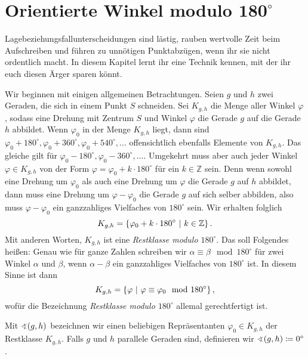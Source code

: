 \section{Orientierte Winkel modulo \texorpdfstring{$\boldsymbol{180^\circ}$}{180°}}\label{kapitel:OrientierteWinkel}
Lagebeziehungsfallunterscheidungen sind lästig, rauben wertvolle Zeit beim Aufschreiben und führen zu unnötigen Punktabzügen, wenn ihr sie nicht ordentlich macht. In diesem Kapitel lernt ihr eine Technik kennen, mit der ihr euch diesen Ärger sparen könnt.

Wir beginnen mit einigen allgemeinen Betrachtungen. Seien $g$ und $h$ zwei Geraden, die sich in einem Punkt $S$ schneiden. Sei $K_{g,h}$ die Menge aller Winkel $\varphi$, sodass eine Drehung mit Zentrum $S$ und Winkel $\varphi$ die Gerade $g$ auf die Gerade $h$ abbildet. Wenn $\varphi_0$ in der Menge $K_{g,h}$ liegt, dann sind $\varphi_0 + 180^\circ,\varphi_0 + 360^\circ,\varphi_0 + 540^\circ,\dotsc$ offensichtlich ebenfalls Elemente von $K_{g,h}$. Das gleiche gilt für $\varphi_0 - 180^\circ,\varphi_0 - 360^\circ,\dotsc$. Umgekehrt muss aber auch jeder Winkel $\varphi\in K_{g,h}$ von der Form $\varphi=\varphi_0 + k\cdot 180^\circ$ für ein $k\in \mathbb Z$ sein. Denn wenn sowohl eine Drehung um $\varphi_0$ als auch eine Drehung um $\varphi$ die Gerade $g$ auf $h$ abbildet, dann muss eine Drehung um $\varphi - \varphi_0$ die Gerade $g$ auf sich selber abbilden, also muss $\varphi - \varphi_0$ ein ganzzahliges Vielfaches von $180^\circ$ sein. Wir erhalten folglich
\begin{equation*}
	K_{g,h}=\braces*{\varphi_0 + k\cdot 180^\circ\ \middle|\  k\in \mathbb Z}\,.
\end{equation*}
Mit anderen Worten, $K_{g,h}$ ist eine \emph{Restklasse modulo $180^\circ$}. Das soll Folgendes heißen: Genau wie für ganze Zahlen schreiben wir $\alpha\equiv\beta \mod 180^\circ$ für zwei Winkel $\alpha$ und $\beta$, wenn $\alpha - \beta$ ein ganzzahliges Vielfaches von $180^\circ$ ist. In diesem Sinne ist dann
\begin{equation*}
	K_{g,h}=\braces*{\varphi\ \middle|\ \varphi\equiv\varphi_0 \mod 180^\circ}\,,
\end{equation*}
wofür die Bezeichnung \emph{Restklasse modulo $180^\circ$} allemal gerechtfertigt ist.
\begin{definition}
	Mit $\winkel(g,h)$ bezeichnen wir einen beliebigen Repräsentanten $\varphi_0\in K_{g,h}$ der Restklasse $K_{g,h}$. Falls $g$ und $h$ parallele Geraden sind, definieren wir $\winkel(g,h)\coloneqq 0^\circ$.
\end{definition}


